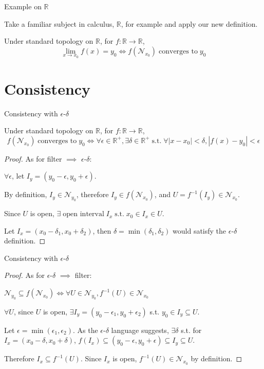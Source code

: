 \documentclass[aspectratio=169]{beamer}
\newcommand{\R}{\mathbb{R}}
\newcommand{\msg}[1]{\; \text{#1} \;}
\newcommand{\st}{\msg{s.t.}}
\begin{document}
	\begin{frame}{Example on $\R$}
		
		Take a familiar subject in calculus, $\R$, for example and apply our new definition.
		
		\begin{definition}[Limit on $\R$]
			Under standard topology on $\R$, for $f: \R \to \R$,
			$$
			\lim_{x \to x_0} f(x) = y_0
			\iff f(\mathcal N_{x_0}) \msg{converges to} y_0
			$$
		\end{definition}
	\end{frame}

	\section{Consistency}
	
	\begin{frame}{Consistency with $\epsilon$-$\delta$}
		\begin{theorem}
		Under standard topology on $\R$, for $f: \R \to \R$,
		$$
		f(\mathcal N_{x_0}) \msg{converges to} y_0
		\iff \forall \epsilon \in \mathbb R^+, \exists \delta \in \mathbb R^+ \st
		\forall \left| x-x_0 \right| < \delta, \left| f(x) - y_0 \right| < \epsilon
		$$
		\end{theorem}
		\begin{proof}
			As for filter $\implies$ $\epsilon$-$\delta$:
			
			$\forall \epsilon$, let $I_y = (y_0 - \epsilon, y_0 + \epsilon)$.
			
			By definition, $I_y \in \mathcal N_{y_0}$, therefore $I_y \in f(\mathcal N_{x_0})$, and $U = f^{-1}(I_y) \in \mathcal N_{x_0}$.
			
			Since $U$ is open, $\exists \msg{open interval} I_x \st x_0 \in I_x \in U$.
			
			Let $I_x = (x_0 - \delta_1, x_0 + \delta_2)$, then $\delta = \min(\delta_1, \delta_2)$ would satisfy the $\epsilon$-$\delta$ definition.
		\end{proof}
	\end{frame}
	
	\begin{frame}{Consistency with $\epsilon$-$\delta$}
		\begin{proof}
			As for $\epsilon$-$\delta$ $\implies$ filter:
			
			$\mathcal N_{y_0} \subseteq f(\mathcal N_{x_0}) \iff \forall U \in \mathcal N_{y_0}, f^{-1}(U) \in \mathcal N_{x_0}$
			
			$\forall U$, since $U$ is open, $\exists I_y = (y_0 - \epsilon_1, y_0 + \epsilon_2)$ s.t. $y_0 \in I_y \subseteq U$.
			
			Let $\epsilon = \min(\epsilon_1, \epsilon_2)$. As the $\epsilon$-$\delta$ language suggests, $\exists \delta$ s.t. for $I_x = (x_0 - \delta, x_0 + \delta)$, $f(I_x) \subseteq (y_0 - \epsilon, y_0 + \epsilon) \subseteq I_y \subseteq U$.
			
			Therefore $I_x \subseteq f^{-1}(U)$. Since $I_x$ is open, $f^{-1}(U) \in \mathcal N_{x_0}$ by definition.
		\end{proof}
	\end{frame}
\end{document}
